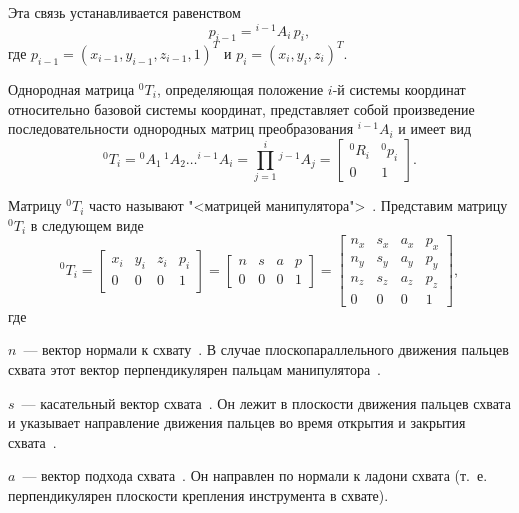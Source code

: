 \documentclass[oneside, final, 14pt]{extarticle}
\begin{document}
Эта связь устанавливается равенством
\begin{equation}
  p_{i-1} = {}^{i-1}A_i\,p_i
  ,
\end{equation}
где \(p_{i-1} = (x_{i-1}, y_{i-1}, z_{i-1}, 1)^T\) и \(p_i = (x_i, y_i, z_i)^T\).
\par
Однородная матрица \({}^0T_i\), определяющая положение \(i\)-й системы координат относительно базовой системы координат, представляет собой произведение последовательности однородных матриц преобразования \({}^{i-1}A_i\) и имеет вид~\cite{fu:rob_tech}
\begin{equation}
  {}^0T_i = {}^{0}A_1\,{}^{1}A_2\ldots{}^{i-1}A_i = \prod^i_{j = 1} {}^{j-1}A_j = 
  \begin{bmatrix}
    {}^0R_i & {}^0p_i \\
	0 & 1
  \end{bmatrix}
  .
  \label{f:matrix_of_robot}
\end{equation}
\par
Матрицу \({}^0T_i\) часто называют "<матрицей манипулятора">~\cite{fu:rob_tech}.
Представим матрицу \({}^0T_i\) в следующем виде~\cite{fu:rob_tech}
\begin{equation}
  {}^0T_i = 
  \begin{bmatrix}
    x_i & y_i & z_i & p_i \\
	0 & 0 & 0 & 1
  \end{bmatrix}
  =
  \begin{bmatrix}
    n & s & a & p \\
	0 & 0 & 0 & 1
  \end{bmatrix}
  =
  \begin{bmatrix}
    n_x & s_x & a_x & p_x \\
    n_y & s_y & a_y & p_y \\
    n_z & s_z & a_z & p_z \\
	0 & 0 & 0 & 1
  \end{bmatrix}
  ,
\end{equation}
где
\par
\(n\)~--- вектор нормали к схвату~\cite{fu:rob_tech}. В случае плоскопараллельного движения пальцев схвата этот вектор перпендикулярен пальцам манипулятора~\cite{fu:rob_tech}.
\par
\(s\)~--- касательный вектор схвата~\cite{fu:rob_tech}. Он лежит в плоскости движения пальцев схвата и указывает направление движения пальцев во время открытия и закрытия схвата~\cite{fu:rob_tech}.
\par
\(a\)~--- вектор подхода схвата~\cite{fu:rob_tech}. Он направлен по нормали к ладони схвата (т.~е. перпендикулярен плоскости крепления инструмента в схвате).
\end{document}
